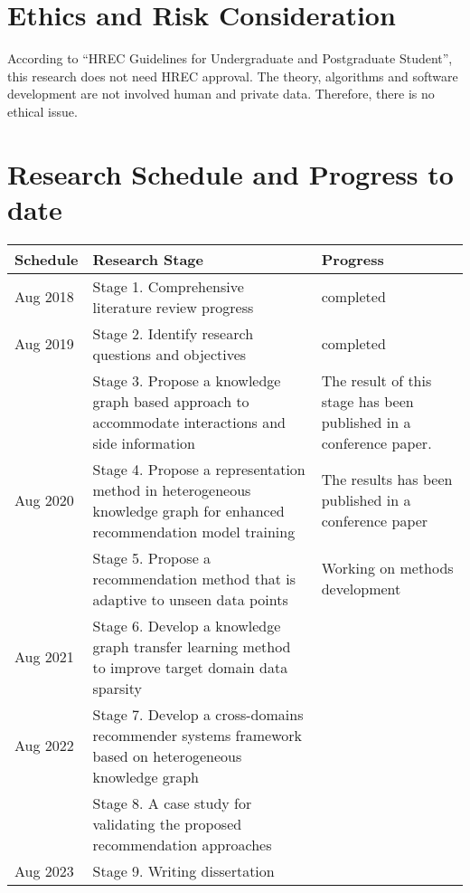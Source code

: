 \section{Ethics and Risk Consideration}
According to ``HREC Guidelines for Undergraduate and Postgraduate Student'', this research does not need HREC approval.
The theory, algorithms and software development are not involved human and private data. Therefore, there is no ethical issue.

\section{Research Schedule and Progress to date}
 

\begin{table}[h!]
    \begin{tabular}{ |p{2cm}|p{6cm}|p{4cm}|}
     \hline
        Schedule & Research Stage & Progress \\
     \hline
        \rowcolor{gray}
        Aug 2018  & Stage 1. Comprehensive literature review progress  & completed  \\
        \hline
        \rowcolor{gray}
        Aug 2019  & Stage 2. Identify research questions and objectives  & completed  \\
        \rowcolor{gray}
        & Stage 3. Propose a knowledge graph based approach to accommodate interactions and side information & The result of this stage has been published in a conference paper. \\
        \hline
        \rowcolor{lightgray}
        Aug 2020  & Stage 4. Propose a representation method in heterogeneous knowledge graph for enhanced recommendation model training & The results has been published in a conference paper  \\
        \rowcolor{lightgray}
        & Stage 5. Propose a recommendation method that is adaptive to unseen data points  & Working on methods development \\
        \hline
        Aug 2021  & Stage 6. Develop a knowledge graph transfer learning method to improve target domain data sparsity & \\
        \hline
        Aug 2022  & Stage 7. Develop a cross-domains recommender systems framework based on heterogeneous knowledge graph  & \\
        & Stage 8.  A case study for validating the proposed recommendation approaches  & \\
        \hline
        Aug 2023 & Stage 9. Writing dissertation & \\
      \hline
     \end{tabular}
\end{table}

